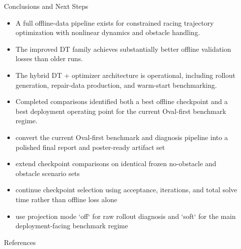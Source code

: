 \documentclass[final]{beamer}
\newlength{\sepwidth}
\newlength{\colwidth}
\newcommand{\separatorcolumn}{\begin{column}{\sepwidth}\end{column}}
\begin{document}
\begin{frame}[t]
\begin{columns}[t]
\begin{column}{\colwidth}
\begin{block}{Conclusions and Next Steps}
\begin{itemize}
  \item A full offline-data pipeline exists for constrained racing trajectory optimization with nonlinear dynamics and obstacle handling.
  \item The improved DT family achieves substantially better offline validation losses than older runs.
  \item The hybrid DT + optimizer architecture is operational, including rollout generation, repair-data production, and warm-start benchmarking.
  \item Completed comparisons identified both a best offline checkpoint and a best deployment operating point for the current Oval-first benchmark regime.
  \item convert the current Oval-first benchmark and diagnosis pipeline into a polished final report and poster-ready artifact set
  \item extend checkpoint comparisons on identical frozen no-obstacle and obstacle scenario sets
  \item continue checkpoint selection using acceptance, iterations, and total solve time rather than offline loss alone
  \item use projection mode `off` for raw rollout diagnosis and `soft` for the main deployment-facing benchmark regime
\end{itemize}
\end{block}

\begin{block}{References}
\vspace{-10pt}
\footnotesize{
  
  \setlength{\bibsep}{0pt}
  
}
\end{block}

\end{column}

\separatorcolumn
\end{columns}
\end{frame}
\end{document}
